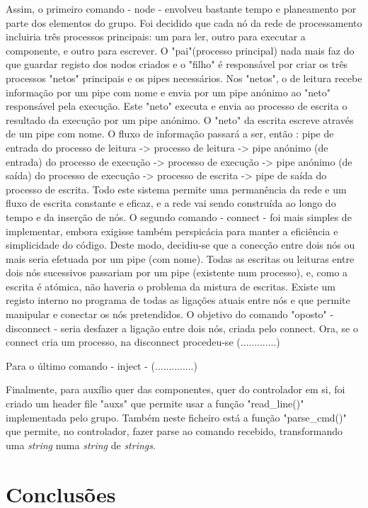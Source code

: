 \documentclass[a4paper]{article}
\begin{document}
Assim, o primeiro comando - node - envolveu bastante tempo e planeamento por parte dos elementos do grupo. Foi decidido que cada nó da rede de processamento incluiria três processos principais: um para ler, outro para executar a componente, e outro para escrever. O "pai"(processo principal) nada mais faz do que guardar registo dos nodos criados e o "filho" é responsável por criar os três processos "netos" principais e os pipes necessários. Nos "netos", o de leitura recebe informação por um pipe com nome e envia por um pipe anónimo ao "neto" responsável pela execução. Este "neto" executa e envia ao processo de escrita o resultado da execução por um pipe anónimo. O "neto" da escrita escreve através de um pipe com nome. O fluxo de informação passará a ser, então : pipe de entrada do processo de leitura -> processo de leitura -> pipe anónimo (de entrada) do processo de execução -> processo de execução -> pipe anónimo (de saída) do processo de execução -> processo de escrita -> pipe de saída do processo de escrita. Todo este sistema permite uma permanência da rede e um fluxo de escrita constante e eficaz, e a rede vai sendo construída ao longo do tempo e da inserção de nós.
O segundo comando - connect - foi mais simples de implementar, embora exigisse também perspicácia para manter a eficiência e simplicidade do código. Deste modo, decidiu-se que a conecção entre dois nós ou mais seria efetuada por um pipe (com nome). Todas as escritas ou leituras entre dois nós sucessivos passariam por um pipe (existente num processo), e, como a escrita é atómica, não haveria o problema da mistura de escritas. Existe um registo interno no programa de todas as ligações atuais entre nós e que permite manipular e conectar os nós pretendidos.
O objetivo do comando "oposto" - disconnect - seria desfazer a ligação entre dois nós, criada pelo connect. Ora, se o connect cria um processo, na disconnect procedeu-se (.............)

Para o último comando - inject - (..............)

\par Finalmente, para auxílio quer das componentes, quer do controlador em si, foi criado um header file "auxs" que permite usar a função "read_line()" implementada pelo grupo. Também neste ficheiro está a função "parse_cmd()" que permite, no controlador, fazer parse ao comando recebido, transformando uma \emph{string} numa \emph{string} de \emph{strings}.



\section{Conclusões}
\label{sec:6}
\end{document}
